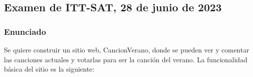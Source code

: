 \subsection{Examen de ITT-SAT, 28 de junio de 2023}
\label{exa-2023-06}

\subsubsection{Enunciado}

Se quiere construir un sitio web, CancionVerano, donde se pueden ver y comentar las canciones actuales y votarlas para ser la canción del verano. La funcionalidad básica del sitio es la siguiente:

